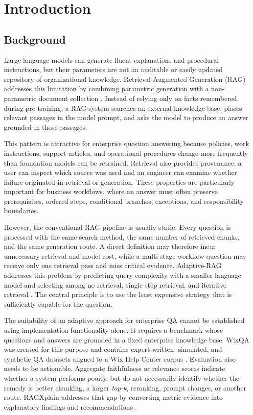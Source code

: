 \chapter{Introduction}
\label{chap:introduction}

\section{Background}

Large language models can generate fluent explanations and procedural
instructions, but their parameters are not an auditable or easily updated
repository of organizational knowledge. Retrieval-Augmented Generation (RAG)
addresses this limitation by combining parametric generation with a
non-parametric document collection \cite{lewis2020rag}. Instead of relying only
on facts remembered during pre-training, a RAG system searches an external
knowledge base, places relevant passages in the model prompt, and asks the model
to produce an answer grounded in those passages.

This pattern is attractive for enterprise question answering because policies,
work instructions, support articles, and operational procedures change more
frequently than foundation models can be retrained. Retrieval also provides
provenance: a user can inspect which source was used and an engineer can examine
whether failure originated in retrieval or generation. These properties are
particularly important for business workflows, where an answer must often
preserve prerequisites, ordered steps, conditional branches, exceptions, and
responsibility boundaries.

However, the conventional RAG pipeline is usually static. Every question is
processed with the same search method, the same number of retrieved chunks, and
the same generation route. A direct definition may therefore incur unnecessary
retrieval and model cost, while a multi-stage workflow question may receive only
one retrieval pass and miss critical evidence. Adaptive-RAG addresses this
problem by predicting query complexity with a smaller language model and
selecting among no retrieval, single-step retrieval, and iterative retrieval
\cite{jeong2024adaptiverag}. The central principle is to use the least expensive
strategy that is sufficiently capable for the question.

The suitability of an adaptive approach for enterprise QA cannot be established
using implementation functionality alone. It requires a benchmark whose
questions and answers are grounded in a fixed enterprise knowledge base. WixQA
was created for this purpose and contains expert-written, simulated, and
synthetic QA datasets aligned to a Wix Help Center corpus
\cite{cohen2025wixqa}. Evaluation also needs to be actionable. Aggregate
faithfulness or relevance scores indicate whether a system performs poorly, but
do not necessarily identify whether the remedy is better chunking, a larger
\textit{top-k}, reranking, prompt changes, or another route. RAGXplain addresses
that gap by converting metric evidence into explanatory findings and
recommendations \cite{cohen2025ragxplain}.

